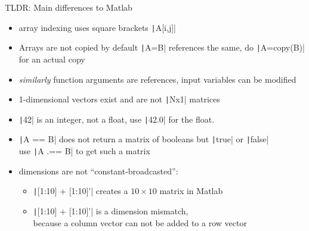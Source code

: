 \documentclass[aspectratio=169, 11pt, handout]{beamer}
\begin{document}
    \begin{frame}[fragile]{TLDR: Main differences to Matlab}
        \begin{itemize}
            \item array indexing uses square brackets \texttt|A[i,j]|
            \item Arrays are not copied by default \texttt|A=B| references the same, do \texttt|A=copy(B)| for an actual copy
            \item \emph{similarly} function arguments are references, \alert{input variables can be modified}
            \item 1-dimensional vectors exist and are not \texttt|Nx1| matrices
            \item \texttt|42| is an integer, not a float, use \texttt|42.0| for the float.
            \item \texttt|A == B| does not return a matrix of booleans but \texttt|true| or \texttt|false|\\
            use \texttt|A .== B| to get such a matrix
            \item dimensions are not “constant-broadcasted”:\\
            \begin{itemize}
                \item \texttt|[1:10] + [1:10]'| creates a $10\times 10$ matrix in Matlab
                \item \texttt|[1:10] + [1:10]'| is a dimension mismatch,\\
                 because a column vector can not be added to a row vector
            \end{itemize}
        \end{itemize}
    \end{frame}
\end{document}
